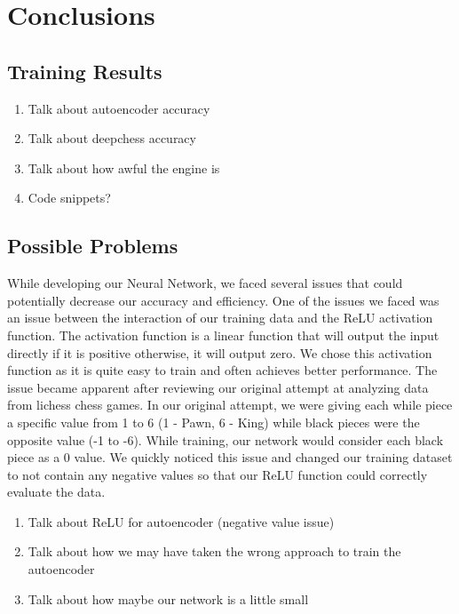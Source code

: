 \documentclass[12pt]{article}
\begin{document}
    \section{Conclusions}

    \subsection{Training Results}

    \begin{enumerate}
        \item Talk about autoencoder accuracy 
        \item Talk about deepchess accuracy 
        \item Talk about how awful the engine is 
        \item Code snippets?
    \end{enumerate}

    \subsection{Possible Problems}

    While developing our Neural Network, we faced several issues that could potentially decrease our accuracy and efficiency. One of the issues we faced was an issue between the interaction of our training data and the ReLU activation function. The activation function is a linear function that will output the input directly if it is positive otherwise, it will output zero. We chose this activation function as it is quite easy to train and often achieves better performance. The issue became apparent after reviewing our original attempt at analyzing data from lichess chess games. In our original attempt, we were giving each while piece a specific value from 1 to 6 (1 - Pawn, 6 - King) while black pieces were the opposite value (-1 to -6). While training, our network would consider each black piece as a 0 value. We quickly noticed this issue and changed our training dataset to not contain any negative values so that our ReLU function could correctly evaluate the data. 
    
    \begin{enumerate}
        \item Talk about ReLU for autoencoder (negative value issue)
        \item Talk about how we may have taken the wrong approach to train the autoencoder
        \item Talk about how maybe our network is a little small 
    \end{enumerate}
\end{document}
